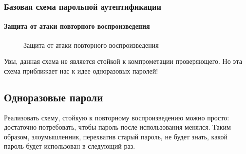 \begin{frame}
\frametitle{Базовая схема парольной аутентификации}
\framesubtitle{Защита от атаки повторного воспроизведения}
\begin{figure}
    \begin{center}
    \end{center}
    \caption{Защита от атаки повторного воспроизведения}\label{pict:pwdhashreplay}
\end{figure} 
\end{frame}

Увы, данная схема не является стойкой к компрометации проверяющего. Но эта схема приближает нас к идее одноразовых паролей!


\subsection{Одноразовые пароли}


Реализовать схему, стойкую к повторному воспроизведению можно просто: достаточно потребовать, чтобы пароль после использования менялся. Таким образом, злоумышленник, перехватив старый пароль, не будет знать, какой пароль будет использован в следующий раз.


